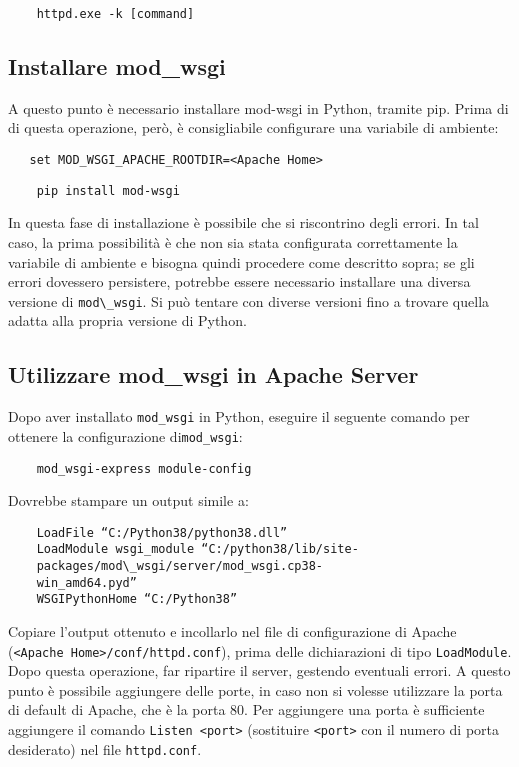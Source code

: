 \begin{verbatim}
    httpd.exe -k [command]
\end{verbatim}

\subsection*{Installare mod\_wsgi}
A questo punto è necessario installare mod-wsgi in Python, tramite pip. Prima di di questa operazione, però, è consigliabile configurare una variabile di ambiente:

\begin{verbatim}
   set MOD_WSGI_APACHE_ROOTDIR=<Apache Home> 
\end{verbatim}

\begin{verbatim}
    pip install mod-wsgi
\end{verbatim}
In questa fase di installazione è possibile che si riscontrino degli errori. In tal caso, la prima possibilità è che non sia stata configurata correttamente la variabile di ambiente e bisogna quindi procedere come descritto sopra; se gli errori dovessero persistere, potrebbe essere necessario installare una diversa versione di \verb|mod\_wsgi|. Si può tentare con diverse versioni fino a trovare quella adatta alla propria versione di Python.

\subsection*{Utilizzare mod\_wsgi in Apache Server}

Dopo aver installato \verb|mod_wsgi| in Python, eseguire il seguente comando per ottenere la configurazione di\verb|mod_wsgi|:

\begin{verbatim}
    mod_wsgi-express module-config
\end{verbatim}
Dovrebbe stampare un output simile a:

\begin{verbatim}
    LoadFile “C:/Python38/python38.dll”
    LoadModule wsgi_module “C:/python38/lib/site-
    packages/mod\_wsgi/server/mod_wsgi.cp38-
    win_amd64.pyd”
    WSGIPythonHome “C:/Python38”
\end{verbatim}
Copiare l’output ottenuto e incollarlo nel file di configurazione di Apache
\newline
(\verb|<Apache Home>/conf/httpd.conf|), prima delle dichiarazioni di tipo \verb|LoadModule|.
\newline
Dopo questa operazione, far ripartire il server, gestendo eventuali errori.
\newline
A questo punto è possibile aggiungere delle porte, in caso non si volesse utilizzare la porta di default di Apache, che è la porta 80. Per aggiungere una porta è sufficiente aggiungere il comando  \verb|Listen <port>| (sostituire \verb|<port>| con il numero di porta desiderato) nel file \verb|httpd.conf|.

